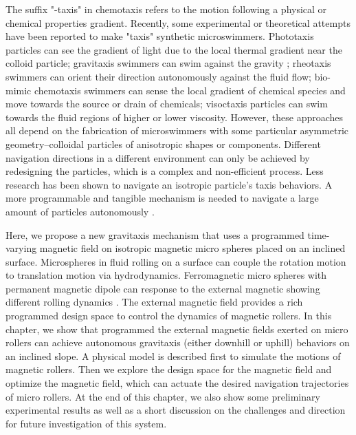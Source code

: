 The suffix "-taxis" in chemotaxis refers to the motion following a physical or chemical properties gradient. Recently, some experimental or theoretical attempts have been reported to make "taxis" synthetic microswimmers. Phototaxis particles can see the gradient of light due to the local thermal gradient near the colloid particle\autocite{yu2019phototaxis,dai2016programmable,lozano2016phototaxis,chen2017light}; gravitaxis swimmers can swim against the gravity \autocite{campbell2013gravitaxis,ten2014gravitaxis}; rheotaxis swimmers can orient their direction autonomously against the fluid flow\autocite{Palacci2015,ren2017rheotaxis,brosseau2019relating}; bio-mimic chemotaxis swimmers can sense the local gradient of chemical species and move towards the source or drain of chemicals\autocite{dou2019autonomous}; visoctaxis particles can swim towards the fluid regions of higher or lower viscosity\autocite{liebchen2018viscotaxis}. However, these approaches all depend on the fabrication of microswimmers with some particular asymmetric geometry--colloidal particles of anisotropic shapes or components. Different navigation directions in a different environment can only be achieved by redesigning the particles, which is a complex and non-efficient process. Less research has been shown to navigate an isotropic particle's taxis behaviors. A more programmable and tangible mechanism is needed to navigate a large amount of particles autonomously \autocite{dou2019autonomous}.

Here, we propose a new gravitaxis mechanism that uses a programmed time-varying magnetic field on isotropic magnetic micro spheres placed on an inclined surface. Microspheres in fluid rolling on a surface can couple the rotation motion to translation motion via hydrodynamics\autocite{galvin2001time,rashidi2016theoretical}. Ferromagnetic micro spheres with permanent magnetic dipole  can response to the external  magnetic showing different rolling dynamics \autocite{helgesen2019propulsion,helgesen2018magnetic}.
The external magnetic field provides a rich programmed design space to control the dynamics of magnetic rollers.
In this chapter, we show that programmed the external magnetic fields exerted on  micro rollers can achieve autonomous gravitaxis (either downhill or uphill) behaviors on an inclined slope. A physical model is described first to simulate the motions of magnetic rollers. Then we explore the design space for the magnetic field  and optimize the magnetic field, which can actuate the desired navigation trajectories of micro rollers. At the end of this chapter, we also show some preliminary experimental results as well as a short discussion on the challenges and direction for future investigation of this system.

